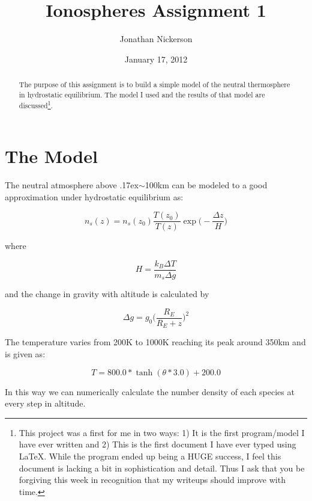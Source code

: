 \documentclass[12pt,letterpaper]{article}
\begin{document}
\title{Ionospheres Assignment 1}
\author{Jonathan Nickerson}
\date{January 17, 2012}
\maketitle
\begin{abstract}
The purpose of this assignment is to build a simple model of the neutral thermosphere in hydrostatic equilibrium. The model I used and the results of that model are discussed\footnote{This project was a first for me in two ways: 1) It is the first program/model I have ever written and 2) This is the first document I have ever typed using LaTeX. While the program ended up being a HUGE success, I feel this document is lacking a bit in sophistication and detail. Thus I ask that you be forgiving this week in recognition that my writeups should improve with time.}.
\end{abstract}
\section{The Model}
The neutral atmosphere above \raise.17ex\hbox{$\scriptstyle\sim$}100km can be modeled to a good approximation under hydrostatic equilibrium as:

\begin{equation}
	n_{s}(z)=n_{s}(z_{0})\frac{T(z_{0})}{T(z)}\exp \bigg(-\frac{\Delta z}{H}\bigg) 
\end{equation}

\noindent where 

\begin{equation}
	H=\frac{k_{B}\Delta T}{m_{s}\Delta g}
\end{equation}

\noindent and the change in gravity with altitude is calculated by

\begin{equation}
	\Delta g=g_{0}\bigg(\frac{R_{E}}{R_{E}+z}\bigg)^2
\end{equation}

The temperature varies from 200K to 1000K reaching its peak around 350km and is given as:

\begin{equation} \label{eq:T1}
	T = 800.0*\tanh(\theta*3.0)+200.0
\end{equation}

\noindent In this way we can numerically calculate the number density of each species at every step in altitude. 
\end{document}
